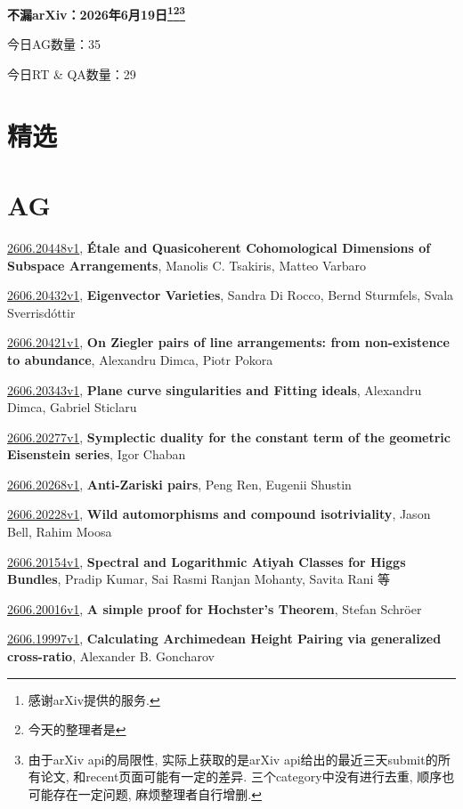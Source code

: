 \documentclass[9pt, a4paper]{article}
\theoremstyle{plain}
\theoremstyle{definition}
\theoremstyle{remark}
\newcommand{\arxiv}[3]{\href{https://arxiv.org/abs/#1}{#1}, \textbf{\textcolor{arxivblue}{#2}}, #3}
\newcommand{\AGnumber}{35}
\newcommand{\RTQAnumber}{29}
\newcommand{\NewestDate}{2026年6月19日}
\newcommand{\todayarXiver}{} %
\begin{document}
\begin{center}
    \Huge\textbf{不漏arXiv：\NewestDate\footnote{感谢arXiv提供的服务.}\footnote{今天的整理者是\todayarXiver}\footnote{由于arXiv api的局限性, 实际上获取的是arXiv api给出的最近三天submit的所有论文, 和recent页面可能有一定的差异. 三个category中没有进行去重, 顺序也可能存在一定问题, 麻烦整理者自行增删.}} \\
\end{center}

\setcounter{section}{-1}

\begin{center}
    今日AG数量：\AGnumber
    
    今日RT \& QA数量：\RTQAnumber
    
\end{center}


\section{精选}


\section{AG}
\arxiv{2606.20448v1}{Étale and Quasicoherent Cohomological Dimensions of Subspace Arrangements}{Manolis C. Tsakiris, Matteo Varbaro}

\arxiv{2606.20432v1}{Eigenvector Varieties}{Sandra Di Rocco, Bernd Sturmfels, Svala Sverrisdóttir}

\arxiv{2606.20421v1}{On Ziegler pairs of line arrangements: from non-existence to abundance}{Alexandru Dimca, Piotr Pokora}

\arxiv{2606.20343v1}{Plane curve singularities and Fitting ideals}{Alexandru Dimca, Gabriel Sticlaru}

\arxiv{2606.20277v1}{Symplectic duality for the constant term of the geometric Eisenstein series}{Igor Chaban}

\arxiv{2606.20268v1}{Anti-Zariski pairs}{Peng Ren, Eugenii Shustin}

\arxiv{2606.20228v1}{Wild automorphisms and compound isotriviality}{Jason Bell, Rahim Moosa}

\arxiv{2606.20154v1}{Spectral and Logarithmic Atiyah Classes for Higgs Bundles}{Pradip Kumar, Sai Rasmi Ranjan Mohanty, Savita Rani 等}

\arxiv{2606.20016v1}{A simple proof for Hochster's Theorem}{Stefan Schröer}

\arxiv{2606.19997v1}{Calculating Archimedean Height Pairing via generalized cross-ratio}{Alexander B. Goncharov}
\end{document}
